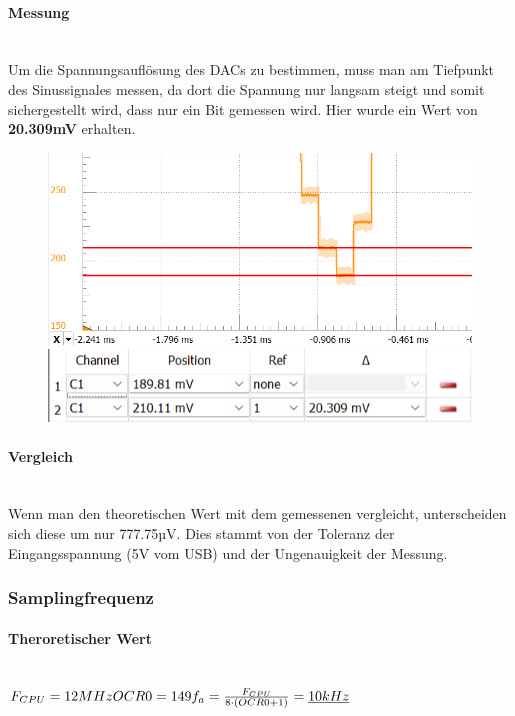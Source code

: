 \documentclass{article}
\begin{document}
\paragraph{Messung}\mbox{}\\
Um die Spannungsauflösung des DACs zu bestimmen, muss man am Tiefpunkt des Sinussignales messen, da dort die Spannung nur langsam steigt und somit sichergestellt wird, dass nur ein Bit gemessen wird. Hier wurde ein Wert von \textbf{20.309mV} erhalten.
\begin{figure}[h]
    \centering
    \includegraphics[width=0.8\linewidth]{img/Messung_Signal_01.png}
    \includegraphics[width=0.8\linewidth]{img/Messung_01.png}
\end{figure}

\paragraph{Vergleich}\mbox{}\\
Wenn man den theoretischen Wert mit dem gemessenen vergleicht, unterscheiden sich diese um nur 777.75µV. Dies stammt von der Toleranz der Eingangsspannung (5V vom USB) und der Ungenauigkeit der Messung.

\subsubsection{Samplingfrequenz}
\paragraph{Theroretischer Wert}\mbox{}\\
\begin{math}
    F_{CPU}=12MHz\\
    OCR0=149\\
    \\
    f_a=\frac{F_{CPU}}{8\cdot (OCR0+1)}=\underline{10kHz}\\
\end{math}
\end{document}
